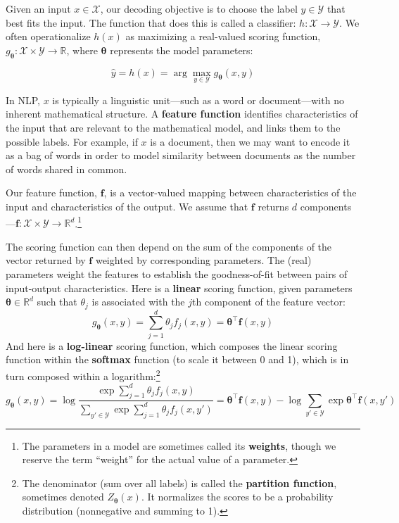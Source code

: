 \documentclass[11pt,letterpaper]{article}
\newcommand{\params}{\mathbf{\theta}}
\begin{document}
Given an input $x \in \mathcal{X}$, our decoding objective is 
to choose the label $y \in \mathcal{Y}$ that best fits the input. 
The function that does this is called a classifier: $h: \mathcal{X}\rightarrow\mathcal{Y}$.
We often operationalize $h(x)$ as maximizing a real-valued scoring function, $g_\params: \mathcal{X}\times\mathcal{Y}\rightarrow\mathbb{R}$, 
where $\params$ represents the model parameters: 

\begin{equation}\label{eq:classifier}
\hat{y} = h(x) = \arg\max_{y\in\mathcal{Y}} g_\params(x,y)
\end{equation}

In NLP, $x$ is typically a linguistic unit---such as a word or document---with no inherent mathematical structure. 
A {\bf feature function} identifies characteristics of the input that are relevant to the mathematical model, 
and links them to the possible labels. 
For example, if $x$ is a document, then we may want to encode it as a bag of words 
in order to model similarity between documents as the number of words shared in common.

Our feature function, $\mathbf{f}$, is a vector-valued mapping between 
characteristics of the input and characteristics of the output.
We assume that $\mathbf{f}$ returns $d$ components---$\mathbf{f}: \mathcal{X}\times\mathcal{Y}\rightarrow\mathbb{R}^d$.\footnote{The parameters in a model are sometimes called its {\bf weights}, 
though we reserve the term ``weight'' for the actual value of a parameter.}

The scoring function can then depend on the sum of the components of the vector returned by $\mathbf{f}$ weighted by corresponding parameters.
The (real) parameters weight the features to establish the goodness-of-fit between pairs of input-output characteristics.  
Here is a {\bf linear} scoring function, 
given parameters $\boldsymbol{\theta}\in\mathbb{R}^d$ such that $\theta_j$ is associated with the $j$th component of the feature vector:
\begin{equation}\label{eq:linear}
g_{\boldsymbol{\theta}}(x,y) = \sum_{j=1}^d \theta_j f_j(x,y)
= \boldsymbol{\theta}^{\top} \mathbf{f}(x,y)
\end{equation}
And here is a {\bf log-linear} scoring function, which composes the linear scoring function within the 
{\bf softmax} function (to scale it between 0 and 1), which is in turn composed within a logarithm:\footnote{The denominator (sum over all labels) is called the {\bf partition function}, sometimes denoted $Z_{\boldsymbol{\theta}}(x)$. It normalizes the scores to be a probability distribution (nonnegative and summing to 1).}
\begin{equation}\label{eq:softmax}
g_{\boldsymbol{\theta}}(x,y) = \log\frac{\exp{\sum_{j=1}^d \theta_j f_j(x,y)}}{\sum_{y'\in\mathcal{Y}}\exp{\sum_{j=1}^d \theta_j f_j(x,y')}}
= \boldsymbol{\theta}^{\top} \mathbf{f}(x,y) - \log{\sum_{y'\in\mathcal{Y}}\exp{\boldsymbol{\theta}^{\top} \mathbf{f}(x,y')}}
\end{equation}
\end{document}
